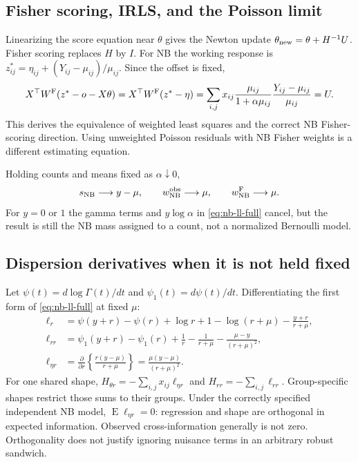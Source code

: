 \documentclass[11pt,a4paper]{article}
\newcommand{\E}{\operatorname{E}}
\numberwithin{equation}{section}
\begin{document}
\subsection{Fisher scoring, IRLS, and the Poisson limit}
Linearizing the score equation near $\theta$ gives the Newton update
$\theta_{\rm new}=\theta+H^{-1}U$.
Fisher scoring replaces $H$ by $I$.
For NB the working response is
$z_{ij}^{*}=\eta_{ij}+(Y_{ij}-\mu_{ij})/\mu_{ij}$.
Since the offset is fixed,
\[
 X^\top W^{\rm F}(z^{*}-o-X\theta)
 =X^\top W^{\rm F}(z^{*}-\eta)
 =\sum_{i,j}x_{ij}
       \frac{\mu_{ij}}{1+\alpha\mu_{ij}}
       \frac{Y_{ij}-\mu_{ij}}{\mu_{ij}}=U.
\]
This derives the equivalence of weighted least squares and the
correct NB Fisher-scoring direction.
Using unweighted Poisson residuals with NB Fisher weights is a
different estimating equation.

Holding counts and means fixed as $\alpha\downarrow0$,
\[
 s_{\rm NB}\longrightarrow y-\mu,\qquad
 w^{\rm obs}_{\rm NB}\longrightarrow\mu,\qquad
 w^{\rm F}_{\rm NB}\longrightarrow\mu.
\]
For $y=0$ or $1$ the gamma terms and $y\log\alpha$ in
\eqref{eq:nb-ll-full} cancel, but the result is still the NB mass assigned
to a count, not a normalized Bernoulli model.

\subsection{Dispersion derivatives when it is not held fixed}
Let $\psi(t)=d\log\Gamma(t)/dt$ and $\psi_1(t)=d\psi(t)/dt$.
Differentiating the first form of \eqref{eq:nb-ll-full} at fixed $\mu$:
\begin{align}
 \ell_r
 &=\psi(y+r)-\psi(r)+\log r+1-\log(r+\mu)
                             -\frac{y+r}{r+\mu},\\
 \ell_{rr}
 &=\psi_1(y+r)-\psi_1(r)+\frac1r-\frac1{r+\mu}
                                  -\frac{\mu-y}{(r+\mu)^2},\\
 \ell_{\eta r}
 &=\frac{\partial}{\partial r}
           \left\{\frac{r(y-\mu)}{r+\mu}\right\}
 =\frac{\mu(y-\mu)}{(r+\mu)^2}.
 \label{eq:nb-nuisance}
\end{align}
For one shared shape, $H_{\theta r}=-\sum_{i,j}x_{ij}\ell_{\eta r}$
and $H_{rr}=-\sum_{i,j}\ell_{rr}$.
Group-specific shapes restrict those sums to their groups.
Under the correctly specified independent NB model,
$\E\ell_{\eta r}=0$: regression and shape are orthogonal in expected
information. Observed cross-information generally is not zero.
Orthogonality does not justify ignoring nuisance terms in an arbitrary
robust sandwich.
\end{document}
